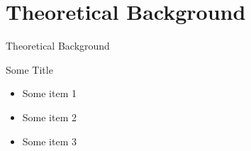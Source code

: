 \setlength{\parskip}{\baselineskip}
\section{Theoretical Background}

\begin{frame}
	\huge Theoretical Background
\end{frame}

\begin{frame}{Some Title}
	\begin{itemize}
		\item Some item 1
		\item Some item 2
		\item Some item 3
	\end{itemize}
\end{frame}
